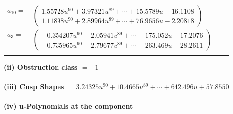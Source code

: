 \documentclass[1p]{elsarticle_modified}
\theoremstyle{definition}
\begin{document}
\begin{tabular}{m{7pt} m{180pt} m{7pt} m{180pt} }
\flushright $a_{10}=$&$\begin{pmatrix}1.55728 u^{90}+3.97321 u^{89}+\cdots+15.5789 u-16.1108\\1.11898 u^{90}+2.89964 u^{89}+\cdots+76.9656 u-2.20818\end{pmatrix}$ \\
\flushright $a_{3}=$&$\begin{pmatrix}-0.354207 u^{90}-2.05941 u^{89}+\cdots-175.052 u-17.2076\\-0.735965 u^{90}-2.79677 u^{89}+\cdots-263.469 u-28.2611\end{pmatrix}$\\&\end{tabular}
\flushleft \textbf{(ii) Obstruction class $= -1$}\\~\\
\flushleft \textbf{(iii) Cusp Shapes $= 3.24325 u^{90}+10.4665 u^{89}+\cdots+642.496 u+57.8550$}\\~\\
\newpage\renewcommand{\arraystretch}{1}
\flushleft \textbf{(iv) u-Polynomials at the component}\newline \\
\end{document}
